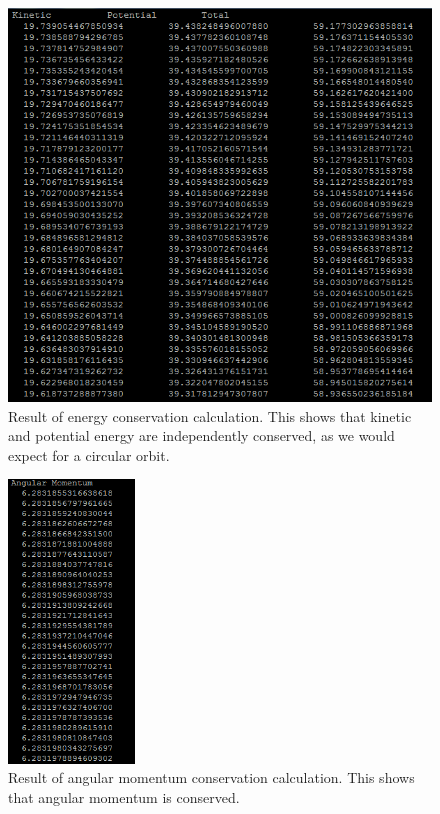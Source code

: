 \documentclass[%
oneside,                 %
final,                   %
10pt]{article}
\begin{document}
\begin{figure}[H]\label{fig:velrplot}
  \centering
    \includegraphics[width=1.0\textwidth]{energy.PNG}
    \caption{Result of energy conservation calculation.  This shows that kinetic and potential energy are independently conserved, as we would expect for a circular orbit.}
\end{figure}

\begin{figure}[H]\label{fig:velrplot}
  \centering
    \includegraphics[width=0.3\textwidth]{Momentum.PNG}
    \caption{Result of angular momentum conservation calculation.  This shows that angular momentum is conserved.}
\end{figure}
\end{document}
